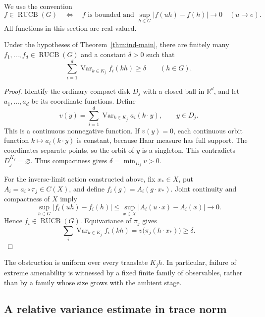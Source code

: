We use the convention
\begin{equation}\label{eq:ind-ruc-convention}
f\in\operatorname{RUCB}(G)
\quad\Longleftrightarrow\quad
f\text{ is bounded and }
\sup_{h\in G}\lvert f(uh)-f(h)\rvert\longrightarrow0\quad(u\to e).
\end{equation}
All functions in this section are real-valued.

\begin{proposition}\label{prop:ind-obstructing-observables}
Under the hypotheses of Theorem~\ref{thm:ind-main}, there are finitely
many $f_1,\ldots,f_d\in\operatorname{RUCB}(G)$ and a constant $\delta>0$ such that
\begin{equation}\label{eq:ind-variance-obstruction}
\sum_{i=1}^d\operatorname{Var}_{k\in K_j}f_i(kh)\ge\delta
\qquad(h\in G).
\end{equation}
\end{proposition}

\begin{proof}
Identify the ordinary compact disk $D_j$ with a closed ball in
$\mathbb R^d$, and let $a_1,\ldots,a_d$ be its coordinate functions. Define
\[
v(y)=\sum_{i=1}^d\operatorname{Var}_{k\in K_j}a_i(k\cdot y),\qquad y\in D_j.
\]
This is a continuous nonnegative function. If $v(y)=0$, each
continuous orbit function $k\mapsto a_i(k\cdot y)$ is constant,
because Haar measure has full support. The coordinates separate
points, so the orbit of $y$ is a singleton. This contradicts
$D_j^{K_j}=\varnothing$. Thus compactness gives
$\delta=\min_{D_j}v>0$.

For the inverse-limit action constructed above, fix $x_*\in X$, put
$A_i=a_i\circ\pi_j\in C(X)$, and define $f_i(g)=A_i(g\cdot x_*)$.
Joint continuity and compactness of $X$ imply
\[
\sup_{h\in G}\lvert f_i(uh)-f_i(h)\rvert
\le\sup_{x\in X}\lvert A_i(u\cdot x)-A_i(x)\rvert\longrightarrow0.
\]
Hence $f_i\in\operatorname{RUCB}(G)$. Equivariance of $\pi_j$ gives
\[
\sum_i\operatorname{Var}_{k\in K_j}f_i(kh)
=v\bigl(\pi_j(h\cdot x_*)\bigr)\ge\delta.
\]
\end{proof}

The obstruction is uniform over every translate $K_jh$. In particular,
failure of extreme amenability is witnessed by a fixed finite family
of observables, rather than by a family whose size grows with the
ambient stage.


\subsection{A relative variance estimate in trace norm}\label{sec:ind-relative}

